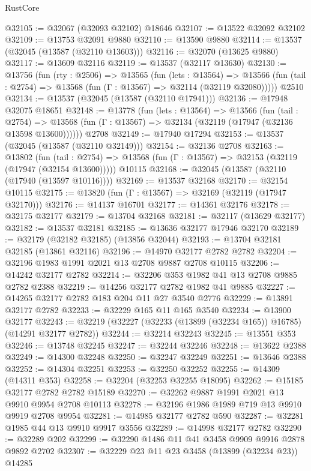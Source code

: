 \begin{lexlean}{RustCore}
\begin{coremodule}
@32105 := @32067 (@32093 @32102) @18646
@32107 := @13522 @32092 @32102
@32109 := @13753 @32091 @9880
@32110 := @13590 @9880
@32114 := @13537 (@32045 (@13587 (@32110 @13603)))
@32116 := @32070 (@13625 @9880)
@32117 := @13609 @32116
@32119 := @13537 (@32117 @13630)
@32130 := @13756
    (fun (rty : @2506) =>
    @13565
      (fun (lets : @13564) =>
      @13566 (fun (tail : @2754) => @13568 (fun (Γ : @13567) => @32114 (@32119 @32080)))))
    @2510
@32134 := @13537 (@32045 (@13587 (@32110 @17941)))
@32136 := @17948 @32075 @18651
@32148 := @13778
    (fun (lets : @13564) =>
    @13566
      (fun (tail : @2754) =>
      @13568 (fun (Γ : @13567) => @32134 (@32119 (@17947 (@32136 @13598 @13600))))))
    @2708
@32149 := @17940 @17294
@32153 := @13537 (@32045 (@13587 (@32110 @32149)))
@32154 := @32136 @2708
@32163 := @13802
    (fun (tail : @2754) => @13568 (fun (Γ : @13567) => @32153 (@32119 (@17947 (@32154 @13600)))))
    @10115
@32168 := @32045 (@13587 (@32110 (@17940 (@13597 @10116))))
@32169 := @13537 @32168
@32170 := @32154 @10115
@32175 := @13820 (fun (Γ : @13567) => @32169 (@32119 (@17947 @32170)))
@32176 := @14137 @16701
@32177 := @14361 @32176
@32178 := @32175 @32177
@32179 := @13704 @32168
@32181 := @32117 (@13629 @32177)
@32182 := @13537 @32181
@32185 := @13636 @32177 @17946 @32170
@32189 := @32179 (@32182 @32185) (@13856 @32044)
@32193 := @13704 @32181 @32185 (@13861 @32116)
@32196 := @14970 @32177 @2782 @2782
@32204 := @32196 @1983 @1991 @2021 @13 @2708 @9887 @2708 @10115
@32206 := @14242 @32177 @2782
@32214 := @32206 @353 @1982 @41 @13 @2708 @9885 @2782 @2388
@32219 := @14256 @32177 @2782 @1982 @41 @9885
@32227 := @14265 @32177 @2782 @183 @204 @11 @27 @3540 @2776
@32229 := @13891 @32177 @2782
@32233 := @32229 @165 @11 @165 @3540
@32234 := @13900 @32177
@32243 := @32219 (@32227 (@32233 (@13899 (@32234 @165)) @16785) (@14291 @32177 @2782))
@32244 := @32214 @32243
@32245 := @13551 @353
@32246 := @13748 @32245
@32247 := @32244 @32246
@32248 := @13622 @2388
@32249 := @14300 @32248
@32250 := @32247 @32249
@32251 := @13646 @2388
@32252 := @14304 @32251
@32253 := @32250 @32252
@32255 := @14309 (@14311 @353)
@32258 := @32204 (@32253 @32255 @18095)
@32262 := @15185 @32177 @2782 @2782 @15189
@32270 := @32262 @9887 @1991 @2021 @13 @9910 @9954 @2708 @10113
@32278 := @32196 @1986 @1989 @719 @13 @9910 @9919 @2708 @9954
@32281 := @14985 @32177 @2782 @590
@32287 := @32281 @1985 @44 @13 @9910 @9917 @3556
@32289 := @14998 @32177 @2782
@32290 := @32289 @202
@32299 := @32290 @1486 @11 @41 @3458 @9909 @9916 @2878 @9892 @2702
@32307 := @32229 @23 @11 @23 @3458 (@13899 (@32234 @23)) @14285

\end{coremodule}
\end{lexlean}
